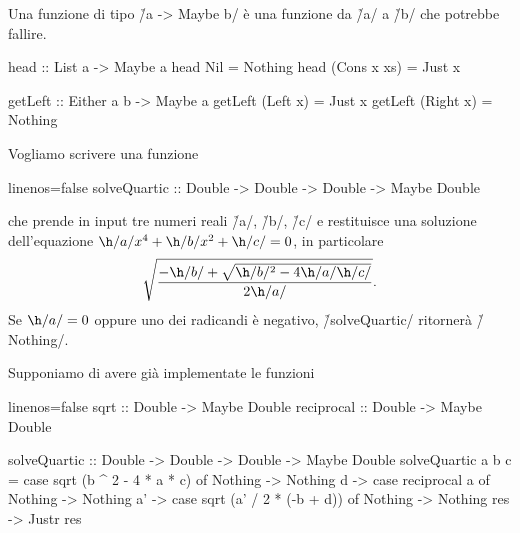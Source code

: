 \begin{frame}[fragile]
Una funzione di tipo \h/a -> Maybe b/ è una funzione da \h/a/ a \h/b/ che potrebbe fallire.

\begin{haskellcode}
head :: List a -> Maybe a
head Nil = Nothing
head (Cons x xs) = Just x

getLeft :: Either a b -> Maybe a
getLeft (Left x) = Just x
getLeft (Right x) = Nothing
\end{haskellcode}
\end{frame}

\begin{frame}[fragile]
Vogliamo scrivere una funzione

\begin{haskellcode*}{linenos=false}
solveQuartic
    :: Double -> Double -> Double -> Maybe Double
\end{haskellcode*}

che prende in input tre numeri reali \h/a/, \h/b/, \h/c/ e restituisce una soluzione dell'equazione $\h/a/x^4+\h/b/x^2+\h/c/=0$, in particolare
\[
\sqrt{\frac{-\h/b/+\sqrt{\h/b/^2-4\h/a/\h/c/}}{2\h/a/}}.
\]
Se $\h/a/=0$ oppure uno dei radicandi è negativo, \h/solveQuartic/ ritornerà \h/Nothing/.
\end{frame}

\begin{frame}[fragile]
Supponiamo di avere già implementate le funzioni
\begin{haskellcode*}{linenos=false}
sqrt :: Double -> Maybe Double
reciprocal :: Double -> Maybe Double
\end{haskellcode*}

\begin{haskellcode}
solveQuartic
    :: Double -> Double -> Double -> Maybe Double
solveQuartic a b c =
    case sqrt (b ^ 2 - 4 * a * c) of
        Nothing -> Nothing
        d -> case reciprocal a of
            Nothing -> Nothing
            a' -> case sqrt (a' / 2 * (-b + d)) of
                Nothing -> Nothing
                res -> Justr res
\end{haskellcode}
\end{frame}